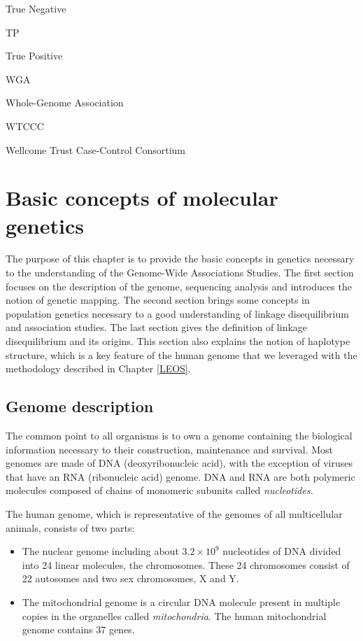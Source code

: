 \documentclass[]{book}
\begin{document}
True Negative

TP

True Positive

WGA

Whole-Genome Association

WTCCC

Wellcome Trust Case-Control Consortium

\hypertarget{genet}{%
\chapter{Basic concepts of molecular genetics}\label{genet}}

The purpose of this chapter is to provide the basic concepts in genetics necessary to the understanding of the Genome-Wide Associations Studies. The first section focuses on the description of the genome, sequencing analysis and introduces the notion of genetic mapping. The second section brings some concepts in population genetics necessary to a good understanding of linkage disequilibrium and association studies. The last section gives the definition of linkage disequilibrium and its origins. This section also explains the notion of haplotype structure, which is a key feature of the human genome that we leveraged with the methodology described in Chapter \ref{LEOS}.

\hypertarget{genome}{%
\section{Genome description}\label{genome}}

The common point to all organisms is to own a genome containing the
biological information necessary to their construction, maintenance and
survival. Most genomes are made of DNA (deoxyribonucleic acid), with the
exception of viruses that have an RNA (ribonucleic acid) genome. DNA and
RNA are both polymeric molecules composed of chains of monomeric
subunits called \emph{nucleotides}.

The human genome, which is representative of the genomes of all
multicellular animals, consists of two parts:

\begin{itemize}
\item
  The nuclear genome including about \(3.2 \times 10^9\) nucleotides of
  DNA divided into 24 linear molecules, the chromosomes. These 24
  chromosomes consist of 22 autosomes and two sex chromosomes, X
  and Y.
\item
  The mitochondrial genome is a circular DNA molecule present in
  multiple copies in the organelles called \emph{mitochondria}. The human
  mitochondrial genome contains 37 genes.
\end{itemize}
\end{document}
